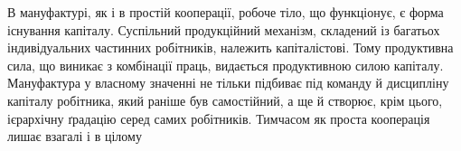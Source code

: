 В мануфактурі, як і в простій кооперації, робоче тіло, що функціонує,
є форма існування капіталу. Суспільний продукційний
механізм, складений із багатьох індивідуальних частинних робітників,
належить капіталістові. Тому продуктивна сила, що виникає
з комбінації праць, видається продуктивною силою капіталу.
Мануфактура у власному значенні не тільки підбиває під команду
й дисципліну капіталу робітника, який раніше був самостійний,
а ще й створює, крім цього, ієрархічну ґрадацію серед самих робітників.
Тимчасом як проста кооперація лишає взагалі і в цілому
\parbreak{}  %
